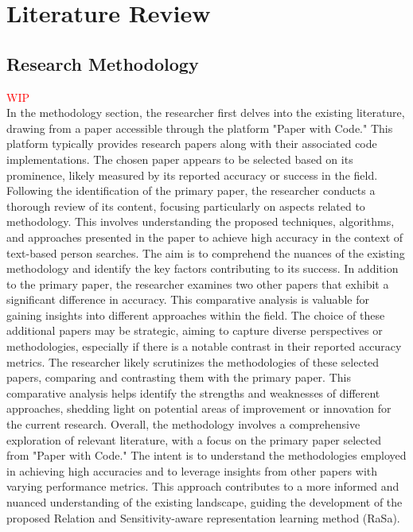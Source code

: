 \chapter{Literature Review}




\section{Research Methodology}
\textcolor{red}{WIP}\\
In the methodology section, the researcher first delves into the existing literature, drawing from a paper accessible through the platform "Paper with Code." This platform typically provides research papers along with their associated code implementations. The chosen paper appears to be selected based on its prominence, likely measured by its reported accuracy or success in the field.
Following the identification of the primary paper, the researcher conducts a thorough review of its content, focusing particularly on aspects related to methodology. This involves understanding the proposed techniques, algorithms, and approaches presented in the paper to achieve high accuracy in the context of text-based person searches. The aim is to comprehend the nuances of the existing methodology and identify the key factors contributing to its success.
In addition to the primary paper, the researcher examines two other papers that exhibit a significant difference in accuracy. This comparative analysis is valuable for gaining insights into different approaches within the field. The choice of these additional papers may be strategic, aiming to capture diverse perspectives or methodologies, especially if there is a notable contrast in their reported accuracy metrics.
The researcher likely scrutinizes the methodologies of these selected papers, comparing and contrasting them with the primary paper. This comparative analysis helps identify the strengths and weaknesses of different approaches, shedding light on potential areas of improvement or innovation for the current research.
Overall, the methodology involves a comprehensive exploration of relevant literature, with a focus on the primary paper selected from "Paper with Code." The intent is to understand the methodologies employed in achieving high accuracies and to leverage insights from other papers with varying performance metrics. This approach contributes to a more informed and nuanced understanding of the existing landscape, guiding the development of the proposed Relation and Sensitivity-aware representation learning method (RaSa).

